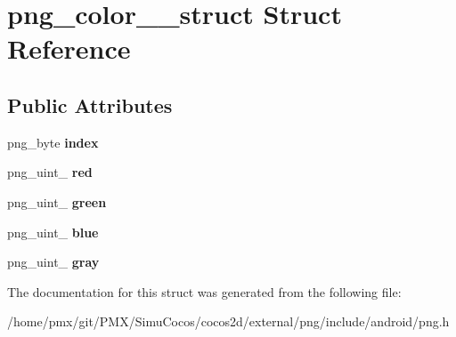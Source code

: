 \hypertarget{structpng__color__16__struct}{}\section{png\+\_\+color\+\_\+\_\+struct Struct Reference}
\label{structpng__color__16__struct}
\subsection*{Public Attributes}
\begin{DoxyCompactItemize}
\item 
\mbox{\label{structpng__color__16__struct_a44a918da0d9a50cf94fcad5a3c741ee0}} 
png\+\_\+byte {\bfseries index}
\item 
\mbox{\label{structpng__color__16__struct_a069bad345aefbe4eab29fcc1d8af91e6}} 
png\+\_\+uint\+\_ {\bfseries red}
\item 
\mbox{\label{structpng__color__16__struct_af01259ffd46c78eff9b1ad584a295126}} 
png\+\_\+uint\+\_ {\bfseries green}
\item 
\mbox{\label{structpng__color__16__struct_afd68833319d436582aa5911de7cdd46b}} 
png\+\_\+uint\+\_ {\bfseries blue}
\item 
\mbox{\label{structpng__color__16__struct_a660a572a0a2f4094408f2fecb61571ac}} 
png\+\_\+uint\+\_ {\bfseries gray}
\end{DoxyCompactItemize}


The documentation for this struct was generated from the following file\+:\begin{DoxyCompactItemize}
\item 
/home/pmx/git/\+P\+M\+X/\+Simu\+Cocos/cocos2d/external/png/include/android/png.\+h\end{DoxyCompactItemize}
